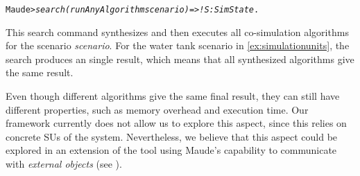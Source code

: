 \small
\begin{alltt}
Maude> \emph{search (runAnyAlgorithm scenario)  =>! S:SimState} . 
\end{alltt}
\normalsize

This search command synthesizes and then executes all co-simulation algorithms for the scenario \emph{scenario}. 
For the water tank scenario in \cref{ex:simulationunits}, the search produces an single result, which means that all synthesized algorithms give the same result.


Even though different algorithms give the same final result, they can still have different properties, such as memory overhead and execution time. 
Our framework currently does not allow us to explore this aspect, since this relies on concrete SUs of the system.
Nevertheless, we believe that this aspect could be explored in an extension of the tool using Maude's capability to communicate with \emph{external objects} (see \cite[Sect. 9]{maudemanual}).